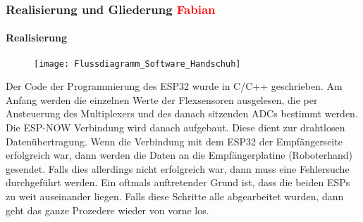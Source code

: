 \documentclass[titlepage,12pt,twoside]{article}
\begin{document}
\subsubsection{Realisierung und Gliederung \textcolor{red}{Fabian}}
\paragraph{Realisierung}
\hfill \break
\hfill \break
\begin{figure}[H]
	\begin{center}
		\scalebox{0.5}
		{\texttt{[image: Flussdiagramm\_Software\_Handschuh]}}
	\end{center}
\end{figure}
\hfill \break
Der Code der Programmierung des ESP32 wurde in C/C++ geschrieben. Am Anfang werden die einzelnen Werte der Flexsensoren 
ausgelesen, die per Ansteuerung des Multiplexers und des danach sitzenden ADCs bestimmt werden. Die ESP-NOW Verbindung wird 
danach aufgebaut. Diese dient zur drahtlosen Datenübertragung. Wenn die Verbindung mit dem ESP32 der Empfängerseite erfolgreich 
war, dann werden die Daten an die Empfängerplatine (Roboterhand) gesendet. Falls dies allerdings nicht erfolgreich war, dann 
muss eine Fehlersuche durchgeführt werden. Ein oftmals auftretender Grund ist, dass die beiden ESPs zu weit auseinander liegen. 
Falls diese Schritte alle abgearbeitet wurden, dann geht das ganze Prozedere wieder von vorne los. \\
\\
\end{document}
